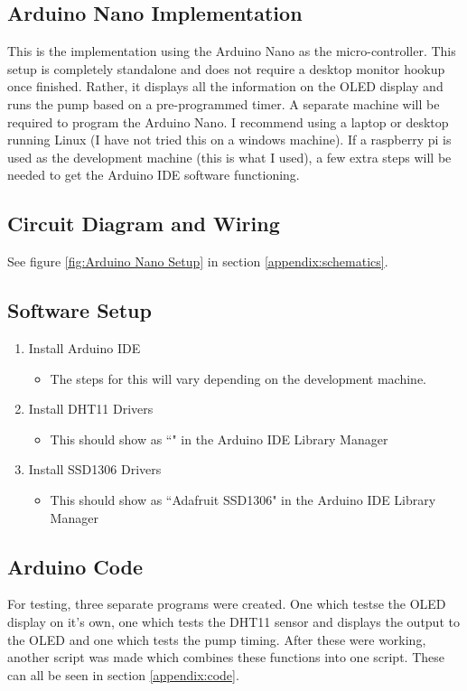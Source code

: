 \documentclass{article}
\begin{document}
\begin{multicols}{2}
		\section{Arduino Nano Implementation}
		This is the implementation using the Arduino Nano as the micro-controller. This setup is completely standalone and does not require a desktop monitor hookup once finished. Rather, it displays all the information on the OLED display and runs the pump based on a pre-programmed timer. A separate machine will be required to program the Arduino Nano. I recommend using a laptop or desktop running Linux (I have not tried this on a windows machine). If a raspberry pi is used as the development machine (this is what I used), a few extra steps will be needed to get the Arduino IDE software functioning. 
		
		\subsection{Circuit Diagram and Wiring}
		See figure \ref{fig:Arduino Nano Setup} in section \ref{appendix:schematics}.
		
		\subsection{Software Setup}
		\begin{enumerate}
			\item Install Arduino IDE
			\begin{itemize}
				\item The steps for this will vary depending on the development machine.
			\end{itemize}
			\item Install DHT11 Drivers
			\begin{itemize}
				\item This should show as ``" in the Arduino IDE Library Manager
			\end{itemize}
			\item Install SSD1306 Drivers
			\begin{itemize}
				\item This should show as ``Adafruit SSD1306" in the Arduino IDE Library Manager
			\end{itemize}
		\end{enumerate}
		
		\subsection{Arduino Code}
		For testing, three separate programs were created. One which testse the OLED display on it's own, one which tests the DHT11 sensor and displays the output to the OLED and one which tests the pump timing. After these were working, another script was made which combines these functions into one script. These can all be seen in section \ref{appendix:code}.
		

\end{multicols}
\end{document}
